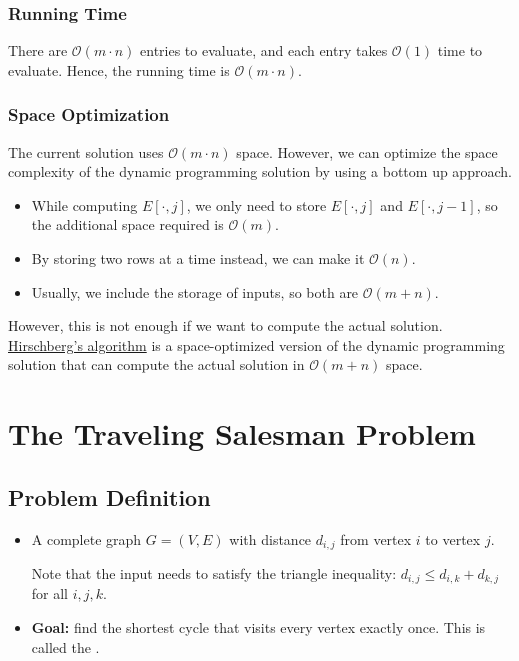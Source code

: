 \subsubsection{Running Time}

There are $\mathcal{O}(m \cdot n)$ entries to evaluate, and each entry takes $\mathcal{O}(1)$ time to evaluate. Hence, the running time is $\mathcal{O}(m \cdot n)$.

\subsubsection{Space Optimization}

The current solution uses $\mathcal{O}(m \cdot n)$ space. However, we can optimize the space complexity of the dynamic programming solution by using a bottom up approach. 

\begin{itemize}
    \item While computing $E[\cdot,j]$, we only need to store $E[\cdot,j]$ and $E[\cdot,j-1]$, so the additional space required is $\mathcal{O}(m)$.
    \item By storing two rows at a time instead, we can make it $\mathcal{O}(n)$.
    \item Usually, we include the storage of inputs, so both are $\mathcal{O}(m + n)$.
\end{itemize}

However, this is not enough if we want to compute the actual solution. \href{https://en.wikipedia.org/wiki/Hirschberg%27s_algorithm}{Hirschberg's algorithm} is a space-optimized version of the dynamic programming solution that can compute the actual solution in $\mathcal{O}(m + n)$ space.


\section{The Traveling Salesman Problem}

\subsection{Problem Definition}

\begin{itemize}
    \item A complete graph $G = (V, E)$ with distance $d_{i, j}$ from vertex $i$ to vertex $j$.
    
    Note that the input needs to satisfy the triangle inequality: $d_{i, j} \le d_{i, k} + d_{k, j}$ for all $i, j, k$.

    \item \textbf{Goal:} find the shortest cycle that visits every vertex exactly once. This is called the .
\end{itemize}

